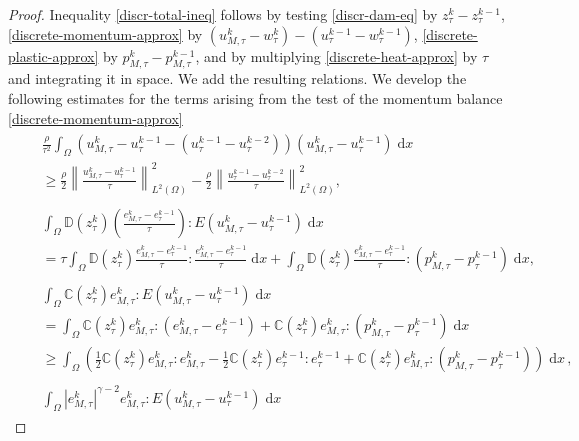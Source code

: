 \documentclass[a4paper,10pt,reqno]{amsart}
\numberwithin{equation}{section}
\numberwithin{equation}{section}
\def\dd{\;\!\mathrm{d}} %
\newcommand{\sig}[1]{E(#1)}
\newcommand{\bbC}{\mathbb{C}}
\newcommand{\bbD}{\mathbb{D}}
\newcommand{\wtau}[1]{w_\tau^{#1}}
\newcommand{\utau}[1]{u_\tau^{#1}}
\newcommand{\ptau}[1]{p_\tau^{#1}}
\newcommand{\ztau}[1]{z_\tau^{#1}}
\newcommand{\etau}[1]{e_\tau^{#1}}
\newcommand{\utaum}[1]{u_{M,\tau}^{#1}}
\newcommand{\ptaum}[1]{p_{M,\tau}^{#1}}
\newcommand{\etaum}[1]{e_{M,\tau}^{#1}}
\begin{document}
\begin{proof} Inequality \eqref{discr-total-ineq} follows  by
testing 
\eqref{discr-dam-eq} by $\ztau{k} - \ztau{k-1}$, 
\eqref{discrete-momentum-approx} by  $(\utaum k {-}\wtau k) - (\utau {k-1} {-} \wtau {k-1})$, 
\eqref{discrete-plastic-approx} by $\ptaum k - \ptaum{k-1}$, and 
by multiplying  \eqref{discrete-heat-approx} by $\tau$ and integrating it in space. 
 We add  the resulting relations.
  We  develop  the following estimates  for the terms arising from the  test of the momentum balance \eqref{discrete-momentum-approx}
\begin{subequations}
\label{est-mimick}
\begin{align}
&
\label{est-mimick-1}
\begin{aligned}
&
\frac{\rho}{\tau^2} \int_\Omega \left(\utaum {k} {-} \utau{k-1} {-} (\utau{k-1}{ -} \utau{k-2} )   \right) (\utaum{k} {- }  \utau{k-1} )  \dd x \\ & \geq  \frac{\rho}2 \left\| \frac{\utaum k - \utau{k-1}}{\tau} \right\|_{L^2(\Omega)}^2 -  \frac{\rho}2 \left\| \frac{\utau {k-1} - \utau{k-2}}{\tau} \right\|_{L^2(\Omega)}^2,
\end{aligned}
\\
&    
\label{est-mimick-2}
\begin{aligned}
&
\int_\Omega \bbD(\ztau k) \left(\frac{\etaum k - \etau{k-1}}\tau
\right){:} \sig{\utaum k - \utau{k-1}} \dd x 
\\ &  = \tau \int_\Omega \bbD(\ztau k)   \frac{\etaum k - \etau{k-1}}\tau {:}\frac{\etaum k - \etau{k-1}}\tau  \dd x +\int_\Omega \bbD(\ztau k)
   \frac{\etaum k - \etau{k-1}}\tau{ :} (\ptaum k{ -} \ptau {k-1}) \dd x, 
\end{aligned}
\\
& 
\label{est-mimick-3}
\begin{aligned}
&
\int_\Omega {\bbC} (\ztau k) \etaum k {:}   \sig{\utaum k - \utau{k-1}} \dd x   
\\
&
 = \int_\Omega  {\bbC}(\ztau k)  \etaum {k} : (\etaum k - \etau{k-1}) +   {\bbC} (\ztau k)
\etaum {k} : (\ptaum k {-} \ptau{k-1}) \dd x 
\\  & \geq \int_\Omega \left(  \tfrac12 {\bbC}(\ztau k)  \etaum {k} {:}  \etaum {k}  - \tfrac12 {\bbC} (\ztau k) \etau{k-1}{:} \etau{k-1} +{\bbC}(\ztau k) \etaum {k} : (\ptaum k {-} \ptau{k-1}) \right) \dd x 
 \,, \end{aligned}
\\
& 
\label{est-mimick-4}
\begin{aligned}
&
\int_\Omega |\etaum k|^{\gamma-2} \etaum k   :   \sig{\utaum k - \utau{k-1}}  \dd x 

\end{aligned}
\end{align}
\end{subequations}
\end{proof}
\end{document}
